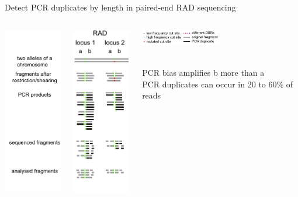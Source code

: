 \documentclass[presentation]{beamer}
\begin{document}
\begin{frame}[label=sec-3-2-1]{Detect PCR duplicates by length in paired-end RAD sequencing}
\vspace{0.1cm}

\begin{columns}
\begin{column}{0.3\columnwidth}
\begin{raggedright}
\includegraphics[width=2.8cm]{Schweyen2014Fig2a.png}
\end{raggedright}
\end{column}

\begin{column}{0.3\columnwidth}
\begin{raggedleft}
\includegraphics[width=2.8cm]{Schweyen2014Fig2b.png}
\end{raggedleft}
\end{column}
\begin{column}{0.3\columnwidth}
\begin{raggedleft}
\includegraphics[width=3.5cm]{Schweyen2014Fig2e.png}
\end{raggedleft}
\tiny{\citep{Schweyen2014}}\\
PCR bias amplifies b more than a\\
PCR duplicates can occur in 20 to 60\% of reads
\end{column}
\end{columns}
\end{frame}
\end{document}
